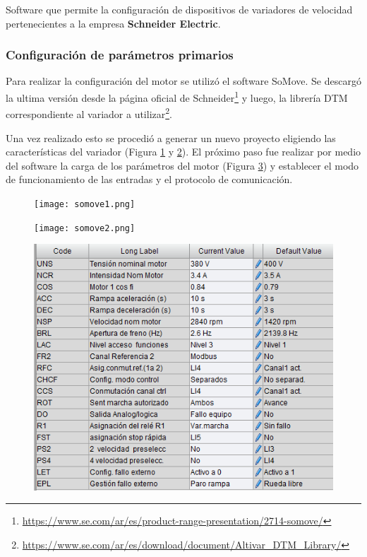 \begin{tcolorbox}[colback=blue!5!white,colframe=blue!75!black,title=SoMove]
	Software que permite la configuración de dispositivos de variadores de velocidad pertenecientes a la empresa \textbf{Schneider Electric}.
\end{tcolorbox}


\subsubsection{Configuración de parámetros primarios}
Para realizar la configuración del motor se utilizó el software SoMove. Se descargó la ultima versión desde la página oficial de Schneider\footnote{\url{https://www.se.com/ar/es/product-range-presentation/2714-somove/}} y luego, la librería DTM correspondiente al variador a utilizar\footnote{\url{https://www.se.com/ar/es/download/document/Altivar_DTM_Library/}}.

Una vez realizado esto se procedió a generar un nuevo proyecto eligiendo las características del variador (Figura \ref{fig:so1} y \ref{fig:so2}). El próximo paso fue realizar por medio del software la carga de los parámetros del motor (Figura \ref{fig:paramsomove}) y establecer el modo de funcionamiento de las entradas y el protocolo de comunicación.
\begin{figure}[h]
	\centering
	\texttt{[image: somove1.png]}
	\label{fig:so1}
\end{figure}
\begin{figure}[H]
	\centering
	\texttt{[image: somove2.png]}
	\label{fig:so2}
\end{figure}

\begin{figure}[H]
	\centering
	\includegraphics[scale=0.45]{images/paramsomove}
	\caption[Lista de parámetros modificados]{}
	\label{fig:paramsomove}
\end{figure}


